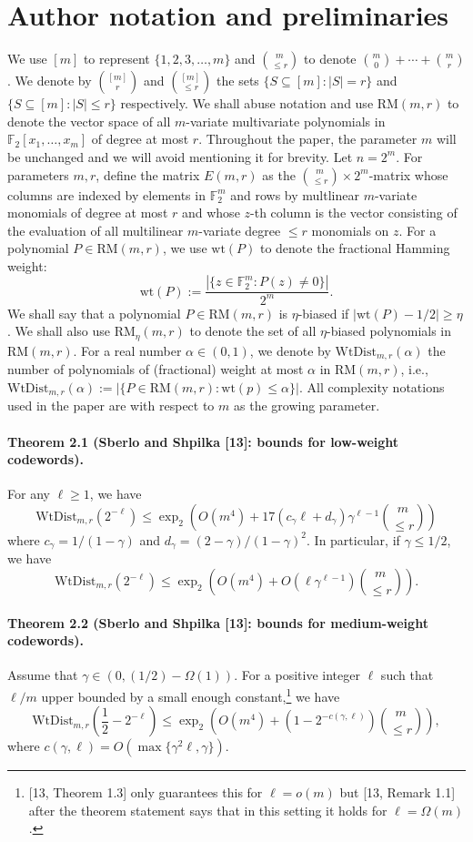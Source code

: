 \section*{Author notation and preliminaries}
We use $[m]$ to represent $\{1,2,3,\ldots,m\}$ and $\binom m{\le r}$ to denote $\binom m0+\cdots+\binom mr$. We denote by $\binom{[m]}r$ and $\binom{[m]}{\le r}$ the sets $\{S\subseteq[m]:|S|=r\}$ and $\{S\subseteq[m]:|S|\le r\}$ respectively.
We shall abuse notation and use $\mathrm{RM}(m,r)$ to denote the vector space of all $m$-variate multivariate polynomials in $\mathbb F_2[x_1,\ldots,x_m]$ of degree at most $r$. Throughout the paper, the parameter $m$ will be unchanged and we will avoid mentioning it for brevity. Let $n=2^m$.
For parameters $m,r$, define the matrix $E(m,r)$ as the $\binom m{\le r}\times2^m$-matrix whose columns are indexed by elements in $\mathbb F_2^m$ and rows by multlinear $m$-variate monomials of degree at most $r$ and whose $z$-th column is the vector consisting of the evaluation of all multilinear $m$-variate degree $\le r$ monomials on $z$.
For a polynomial $P\in\mathrm{RM}(m,r)$, we use $\mathrm{wt}(P)$ to denote the fractional Hamming weight:
\[\mathrm{wt}(P):=\frac{|\{z\in\mathbb F_2^m:P(z)\ne0\}|}{2^m}.\]
We shall say that a polynomial $P\in\mathrm{RM}(m,r)$ is $\eta$-biased if $|\mathrm{wt}(P)-1/2|\ge\eta$. We shall also use $\mathrm{RM}_\eta(m,r)$ to denote the set of all $\eta$-biased polynomials in $\mathrm{RM}(m,r)$. For a real number $\alpha\in(0,1)$, we denote by $\mathrm{WtDist}_{m,r}(\alpha)$ the number of polynomials of (fractional) weight at most $\alpha$ in $\mathrm{RM}(m,r)$, i.e., $\mathrm{WtDist}_{m,r}(\alpha):=|\{P\in\mathrm{RM}(m,r):\mathrm{wt}(p)\le\alpha\}|$. All complexity notations used in the paper are with respect to $m$ as the growing parameter.
\paragraph{Theorem 2.1 (Sberlo and Shpilka [13]: bounds for low-weight codewords).} For any $\ell\ge1$, we have
\[\mathrm{WtDist}_{m,r}(2^{-\ell})\le\operatorname{exp}_2\left(O(m^4)+17(c_\gamma\ell+d_\gamma)\gamma^{\ell-1}\binom m{\le r}\right)\]
where $c_\gamma=1/(1-\gamma)$ and $d_\gamma=(2-\gamma)/(1-\gamma)^2$. In particular, if $\gamma\le1/2$, we have
\[\mathrm{WtDist}_{m,r}(2^{-\ell})\le\operatorname{exp}_2\left(O(m^4)+O(\ell\gamma^{\ell-1})\binom m{\le r}\right).\tag{1}\]
\paragraph{Theorem 2.2 (Sberlo and Shpilka [13]: bounds for medium-weight codewords).} Assume that $\gamma\in(0,(1/2)-\Omega(1))$. For a positive integer $\ell$ such that $\ell/m$ upper bounded by a small enough constant,\footnote{[13, Theorem 1.3] only guarantees this for $\ell=o(m)$ but [13, Remark 1.1] after the theorem statement says that in this setting it holds for $\ell=\Omega(m)$.} we have
\[\mathrm{WtDist}_{m,r}\left(\frac12-2^{-\ell}\right)\le\operatorname{exp}_2\left(O(m^4)+(1-2^{-c(\gamma,\ell)})\binom m{\le r}\right),\tag{2}\]
where $c(\gamma,\ell)=O(\max\{\gamma^2\ell,\gamma\})$.
